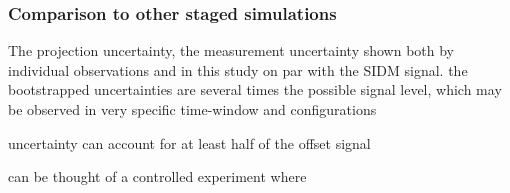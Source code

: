  
% 
% 
\subsubsection{Comparison to other staged simulations}


The projection uncertainty, the measurement uncertainty shown both by
individual observations and in this study   
on par with the SIDM signal.
the bootstrapped uncertainties are several times the possible signal level,
which may be observed in very specific time-window and configurations 

uncertainty can account for at least half of the offset signal

\cite{Kahlhoefer14}
\cite{Randall2008d} can be thought of a controlled experiment where 
\cite{Robertson2016}


% 
% 
% 
% 
% 



